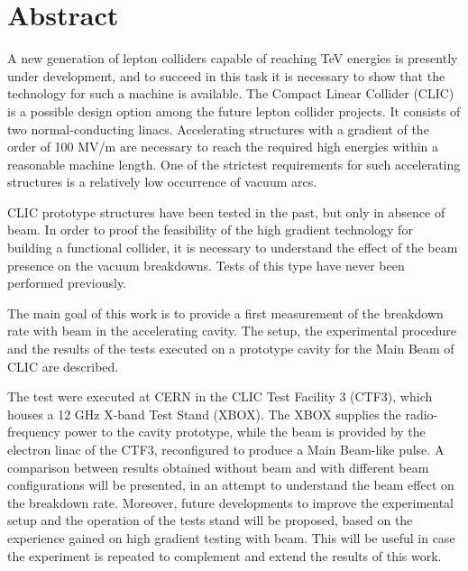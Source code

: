 \chapter*{Abstract}

A new generation of lepton colliders capable of reaching TeV energies is presently under development, and to succeed in this task it is necessary to show that the technology for such a machine is available. The Compact Linear Collider (CLIC) is a possible design option among the future lepton collider projects. It consists of two normal-conducting linacs. Accelerating structures with a gradient of the order of 100 MV/m are necessary to reach the required high energies within a reasonable machine length. One of the strictest requirements for such accelerating structures is a relatively low occurrence of vacuum arcs. 

CLIC prototype structures have been tested in the past, but only in absence of beam. In order to proof the feasibility of the high gradient technology for building a functional collider, it is necessary to understand the effect of the beam presence on the vacuum breakdowns. Tests of this type have never been performed previously. 

The main goal of this work is to provide a first measurement of the breakdown rate with beam in the accelerating cavity. The setup, the experimental procedure and the results of the tests executed on a prototype  cavity for the Main Beam of CLIC are described. 

The test were executed at CERN in the CLIC Test Facility 3 (CTF3), which houses a 12 GHz X-band Test Stand (XBOX). The XBOX supplies the radio-frequency power to the cavity prototype, while the beam is provided by the electron linac of the CTF3, reconfigured to produce a Main Beam-like pulse. 
A comparison between results obtained without beam and with different beam configurations will be presented, in an attempt to understand the beam effect on the breakdown rate. Moreover, future developments to improve the experimental setup and the operation of the tests stand will be proposed, based on the experience gained on high gradient testing with beam. This will be useful in case the experiment is repeated to complement and extend the results of this work.